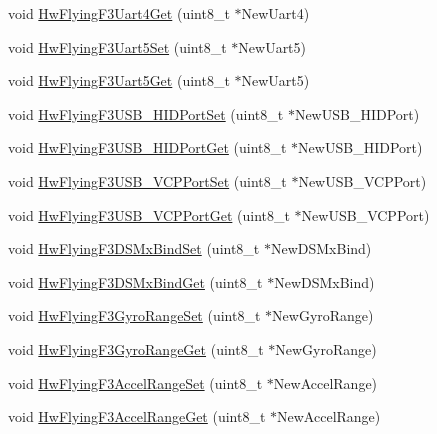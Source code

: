 \begin{DoxyCompactItemize}
\item 
void \hyperlink{group___hw_flying_f3_ga5496a875b5f25ad8700f661f72de6800}{\-Hw\-Flying\-F3\-Uart4\-Get} (uint8\-\_\-t $\ast$\-New\-Uart4)
\item 
void \hyperlink{group___hw_flying_f3_ga26acfa63dede26cadecd3fe21d3b1358}{\-Hw\-Flying\-F3\-Uart5\-Set} (uint8\-\_\-t $\ast$\-New\-Uart5)
\item 
void \hyperlink{group___hw_flying_f3_gab197e68e7668a9edc79390e6ec5501d5}{\-Hw\-Flying\-F3\-Uart5\-Get} (uint8\-\_\-t $\ast$\-New\-Uart5)
\item 
void \hyperlink{group___hw_flying_f3_ga2a404345a0d734033436421e1bdebc55}{\-Hw\-Flying\-F3\-U\-S\-B\-\_\-\-H\-I\-D\-Port\-Set} (uint8\-\_\-t $\ast$\-New\-U\-S\-B\-\_\-\-H\-I\-D\-Port)
\item 
void \hyperlink{group___hw_flying_f3_ga7da7941d9f66930587d083d244d8a76f}{\-Hw\-Flying\-F3\-U\-S\-B\-\_\-\-H\-I\-D\-Port\-Get} (uint8\-\_\-t $\ast$\-New\-U\-S\-B\-\_\-\-H\-I\-D\-Port)
\item 
void \hyperlink{group___hw_flying_f3_ga9503697c55e92b80b894f1b42d4813ba}{\-Hw\-Flying\-F3\-U\-S\-B\-\_\-\-V\-C\-P\-Port\-Set} (uint8\-\_\-t $\ast$\-New\-U\-S\-B\-\_\-\-V\-C\-P\-Port)
\item 
void \hyperlink{group___hw_flying_f3_ga34edfce8c0a3f540223e34fe99a5e377}{\-Hw\-Flying\-F3\-U\-S\-B\-\_\-\-V\-C\-P\-Port\-Get} (uint8\-\_\-t $\ast$\-New\-U\-S\-B\-\_\-\-V\-C\-P\-Port)
\item 
void \hyperlink{group___hw_flying_f3_gabc0c2c6d9f6cb920e149a94caf7b3e86}{\-Hw\-Flying\-F3\-D\-S\-Mx\-Bind\-Set} (uint8\-\_\-t $\ast$\-New\-D\-S\-Mx\-Bind)
\item 
void \hyperlink{group___hw_flying_f3_ga69fa44b275a39ff55dc692cc06aa2788}{\-Hw\-Flying\-F3\-D\-S\-Mx\-Bind\-Get} (uint8\-\_\-t $\ast$\-New\-D\-S\-Mx\-Bind)
\item 
void \hyperlink{group___hw_flying_f3_gae88fe6d59ac597a258174a923de859ee}{\-Hw\-Flying\-F3\-Gyro\-Range\-Set} (uint8\-\_\-t $\ast$\-New\-Gyro\-Range)
\item 
void \hyperlink{group___hw_flying_f3_gaee157bbd01f75dffd8b22ded873d3941}{\-Hw\-Flying\-F3\-Gyro\-Range\-Get} (uint8\-\_\-t $\ast$\-New\-Gyro\-Range)
\item 
void \hyperlink{group___hw_flying_f3_ga9a8f8a4440f0d0ccf322a956eede19cd}{\-Hw\-Flying\-F3\-Accel\-Range\-Set} (uint8\-\_\-t $\ast$\-New\-Accel\-Range)
\item 
void \hyperlink{group___hw_flying_f3_gaab98c299483f1020070ee7783bd66e04}{\-Hw\-Flying\-F3\-Accel\-Range\-Get} (uint8\-\_\-t $\ast$\-New\-Accel\-Range)
\end{DoxyCompactItemize}


